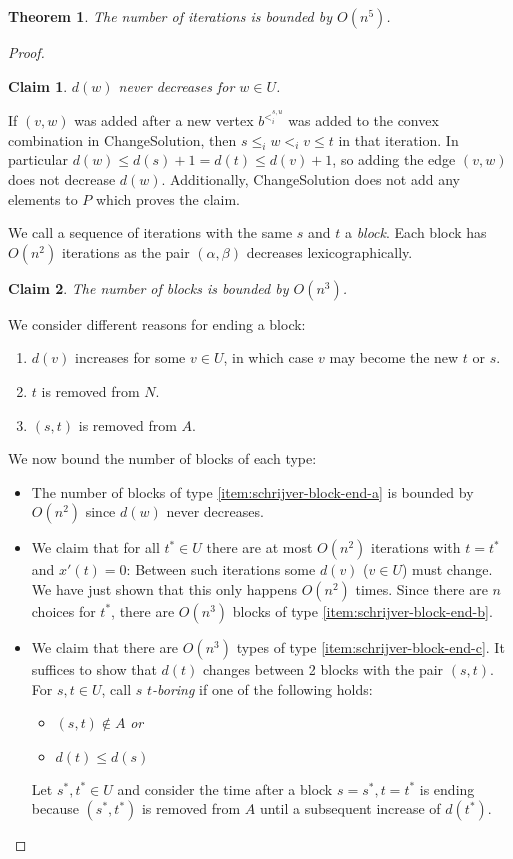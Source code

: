 \documentclass[11pt, a4paper]{article}
\newtheorem{theorem}{Theorem}[section]
\newtheorem*{claim}{Claim}
\theoremstyle{remark}
\theoremstyle{definition}
\begin{document}
\begin{theorem}
	The number of iterations is bounded by $O(n^5)$.
\end{theorem}
\begin{proof}
	\begin{claim}
		$d(w)$ never decreases for $w\in U$.
	\end{claim}
	If $(v,w)$ was added after a new vertex $b^{<_i^{s,u}}$ was added to the
	convex combination in ChangeSolution, then $s\leq_i w<_i v\leq t$ in that
	iteration. In particular $d(w)\leq d(s)+1=d(t)\leq d(v)+1$, so adding
	the edge $(v,w)$ does not decrease $d(w)$. Additionally, ChangeSolution
	does not add any elements to $P$ which proves the claim.

	We call a sequence of iterations with the same $s$ and $t$ a \emph{block}.
	Each block has $O(n^2)$ iterations as the pair $(\alpha,\beta)$ decreases
	lexicographically.
	\begin{claim}
		The number of blocks is bounded by $O(n^3)$.
	\end{claim}
	We consider different reasons for ending a block:
	\begin{enumerate}[label=\alph*)]
		\item\label{item:schrijver-block-end-a}
		$d(v)$ increases for some $v\in U$, in which case $v$ may become the
		new $t$ or $s$.
		\item\label{item:schrijver-block-end-b}
		$t$ is removed from $N$.
		\item\label{item:schrijver-block-end-c}
		$(s,t)$ is removed from $A$.
	\end{enumerate}
	We now bound the number of blocks of each type:
	\begin{itemize}
		\item
		The number of blocks of type \ref{item:schrijver-block-end-a} is bounded
		by $O(n^2)$ since $d(w)$ never decreases.

		\item
		We claim that for all $t^*\in U$ there are at most
		$O(n^2)$ iterations with $t=t^*$ and $x'(t)=0$:
		Between such iterations some $d(v)$ ($v\in U$) must change. We have just
		shown that this only happens $O(n^2)$ times. Since there are $n$ choices
		for $t^*$, there are $O(n^3)$ blocks of type \ref{item:schrijver-block-end-b}.

		\item
		We claim that there are $O(n^3)$ types of type \ref{item:schrijver-block-end-c}.
		It suffices to show that $d(t)$ changes between 2 blocks with the
		pair $(s,t)$. For $s,t\in U$, call $s$ \emph{$t$-boring} if one of
		the following holds:
		\begin{itemize}
			\item $(s,t)\notin A$ \emph{or}
			\item $d(t)\leq d(s)$
		\end{itemize}
		Let $s^*,t^*\in U$ and consider the time after a block $s=s^*,t=t^*$
		is ending because $(s^*,t^*)$ is removed from $A$ until a subsequent
		increase of $d(t^*)$.
		

\end{itemize}
\end{proof}
\end{document}
